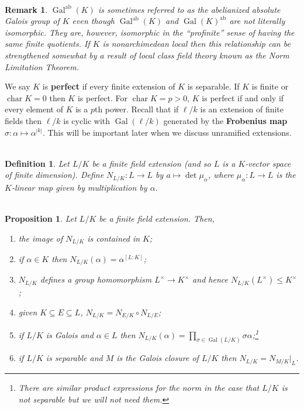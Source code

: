 \documentclass[11pt]{article}
\DeclareMathOperator{\ab}{ab} %
\DeclareMathOperator{\ch}{char}
\DeclareMathOperator{\Gal}{Gal}
\renewcommand{\subset}{\subseteq}
\renewcommand{\l}{\ell}
\newenvironment{enum}[1]{
\begin{enumerate}[label=\textup{({#1*})}]
}
{
\end{enumerate}
}
\newtheorem*{definition*}{\\Definition}
\newtheorem*{proposition*}{\\Proposition}
\newtheorem*{remark*}{\\Remark}
\begin{document}
\begin{remark*}
$\Gal^{\ab}(K)$ is sometimes referred to as the abelianized absolute Galois group of $K$ even though $\Gal^{\ab}(K)$ and $\Gal(K)^{\ab}$ are not literally isomorphic. They are, however, isomorphic in the ``profinite'' sense of having the same finite quotients. If $K$ is nonarchimedean local then this relationship can be strengthened somewhat by a result of local class field theory known as the Norm Limitation Theorem.
\end{remark*}

We say $K$ is \textbf{perfect} if every finite extension of $K$ is separable. If $K$ is finite or $\ch K=0$ then $K$ is perfect. For $\ch K=p>0$, $K$ is perfect if and only if every element of $K$ is a $p$th power. Recall that if $\l/k$ is an extension of finite fields then $\l/k$ is cyclic with $\Gal(\l/k)$ generated by the \textbf{Frobenius map} $\sigma: \alpha\mapsto\alpha^{|k|}$. This will be important later when we discuss unramified extensions.

\begin{definition*}
Let $L/K$ be a finite field extension (and so $L$ is a $K$-vector space of finite dimension). Define $N_{L/K}: L\to L$ by $a\mapsto\det\mu_{\alpha}$, where $\mu_{\alpha}: L\to L$ is the $K$-linear map given by multiplication by $\alpha$.
\end{definition*}

\begin{proposition*}
Let $L/K$ be a finite field extension. Then, 
\begin{enum}{\roman}
\item the image of $N_{L/K}$ is contained in $K$;
\item if $\alpha\in K$ then $N_{L/K}(\alpha)=\alpha^{[L:K]}$;
\item $N_{L/K}$ defines a group homomorphism $L^{\times}\to K^{\times}$ and hence $N_{L/K}(L^{\times})\leq K^{\times}$;
\item given $K\subset E\subset L$, $N_{L/K}=N_{E/K}\circ N_{L/E}$;
\item if $L/K$ is Galois and $\alpha\in L$ then $N_{L/K}(\alpha)=\prod_{\sigma\in\Gal(L/K)}\sigma\alpha$;\footnote{There are similar product expressions for the norm in the case that $L/K$ is not separable but we will not need them.}
\item if $L/K$ is separable and $M$ is the Galois closure of $L/K$ then $N_{L/K}=N_{M/K}|_L$.
\end{enum}
\end{proposition*}
\end{document}
